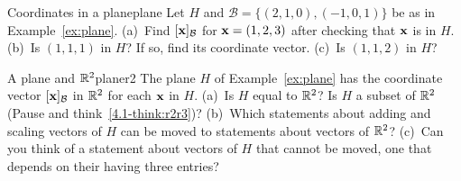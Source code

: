 \documentclass[11pt]{article}
\begin{document}
\begin{kc}{Coordinates in a plane}{plane}
Let $H$ and $\mathcal{B}=\{(2,1,0),(-1,0,1)\}$ be as in Example~\ref{ex:plane}. (a)~Find $[\mathbf{x}]_{\mathcal{B}}$ for $\mathbf{x}=(1,2,3)$ after checking that $\mathbf{x}$ is in $H$. (b)~Is $(1,1,1)$ in $H$? If so, find its coordinate vector. (c)~Is $(1,1,2)$ in $H$?
\end{kc}

\begin{think}{A plane and $\mathbb{R}^2$}{planer2}
The plane $H$ of Example~\ref{ex:plane} has the coordinate vector $[\mathbf{x}]_{\mathcal{B}}$ in $\mathbb{R}^2$ for each $\mathbf{x}$ in $H$. (a)~Is $H$ equal to $\mathbb{R}^2$? Is $H$ a subset of $\mathbb{R}^2$ (Pause and think~\ref{4.1-think:r2r3})? (b)~Which statements about adding and scaling vectors of $H$ can be moved to statements about vectors of $\mathbb{R}^2$? (c)~Can you think of a statement about vectors of $H$ that cannot be moved, one that depends on their having three entries?
\end{think}
\end{document}
